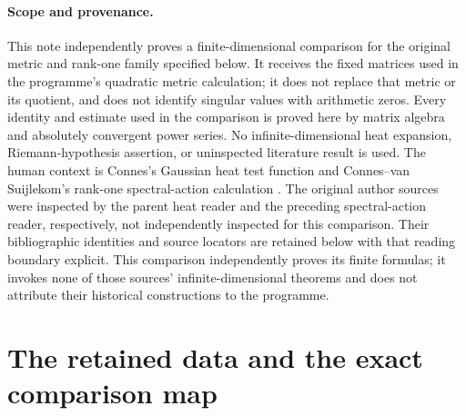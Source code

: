 \paragraph{Scope and provenance.}
This note independently proves a finite-dimensional comparison for the original
metric and rank-one family specified below. It receives the fixed matrices used
in the programme's quadratic metric calculation; it does not replace that metric
or its quotient, and does not identify singular values with arithmetic zeros.
Every identity and estimate used in the comparison is proved here by matrix
algebra and absolutely convergent power series. No infinite-dimensional heat
expansion, Riemann-hypothesis assertion, or uninspected literature result is used.
The human context is Connes's Gaussian heat test function \cite{nhm:ConnesHeat}
and Connes--van Suijlekom's rank-one spectral-action calculation
\cite{nhm:ConnesSuijlekom}. The original author sources were inspected by the parent
heat reader and the preceding spectral-action reader, respectively, not
independently inspected for this comparison. Their bibliographic identities
and source locators are retained below with that reading boundary explicit.
This comparison independently proves its finite formulas; it invokes none of
those sources' infinite-dimensional theorems and does not attribute their
historical constructions to the programme.

\section{The retained data and the exact comparison map}

